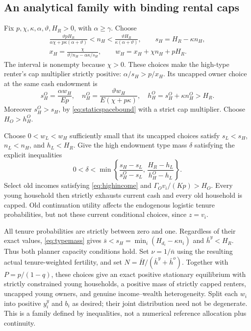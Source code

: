 \documentclass[11pt]{article}
\newcommand{\HH}{\bar H}
\newcommand{\tht}{\vartheta}
\begin{document}
\subsection{An analytical family with binding rental caps}\label{app:activecaps}
Fix $p,\chi,\kappa,\alpha,\tht,H_R>0$, with $\alpha\ge\gamma$. Choose
\begin{equation}
 \begin{gathered}
 \frac{\tht pH_R}{\alpha\chi+p\kappa(\alpha+\tht)}
 <n_H<\frac{\tht H_R}{\kappa(\alpha+\tht)},\qquad s_H=H_R-\kappa n_H,\\
 x_H=\frac\chi{\tht/n_H-\alpha\kappa/s_H},\qquad
 w_H=x_H+\chi n_H+pH_R.
 \end{gathered}\label{eq:highcappedtype}
\end{equation}
The interval is nonempty because $\chi>0$. These choices make the high-type renter's cap multiplier strictly positive: $\alpha/s_H>p/x_H$. Its uncapped owner choice at the same cash endowment is
\[
 s_H^O=\frac{\alpha w_H}{Ep},\quad
 n_H^O=\frac{\tht w_H}{E(\chi+p\kappa)},\quad
 h_H^O=s_H^O+\kappa n_H^O>H_R.
\]
Moreover $s_H^O>s_H$, by \eqref{eq:staticspacebound} with a strict cap multiplier. Choose $H_O>h_H^O$.

Choose $0<w_L<w_H$ sufficiently small that its uncapped choices satisfy
$s_L<s_H$, $n_L<n_H$, and $h_L<H_R$. Give the high endowment type mass $\delta$ satisfying the explicit inequalities
\begin{equation}
 0<\delta<\min\left\{
 \frac{s_H-s_L}{s_H^O-s_L},\,
 \frac{H_R-h_L}{h_H^O-h_L}\right\}.\label{eq:typemass}
\end{equation}
Select old incomes satisfying \eqref{eq:highincome} and
$\Gamma_Ov_i/(Kp)>H_O$. Every young household then strictly exhausts current cash and every old household is capped. Old continuation utility affects the endogenous logistic tenure probabilities, but not these current conditional choices, since $z=v_i$.

All tenure probabilities are strictly between zero and one. Regardless of their exact values, \eqref{eq:typemass} gives
$\bar s<s_H=\min_i(H_{d_i}-\kappa n_i)$ and $\bar h^y<H_R$. Thus both planner capacity conditions hold. Set $\nu=1/\bar n$ using the resulting actual tenure-weighted fertility, and set $N=\HH/(\bar h^y+\bar h^o)$. Together with $P=p/(1-q)$, these choices give an exact positive stationary equilibrium with strictly constrained young households, a positive mass of strictly capped renters, uncapped young owners, and genuine income--wealth heterogeneity. Split each $w_i$ into positive $y_i^y$ and $b_i$ as desired; their joint distribution need not be degenerate. This is a family defined by inequalities, not a numerical reference allocation plus continuity.
\end{document}
